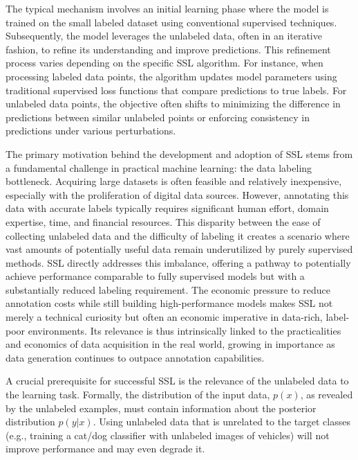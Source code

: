 The typical mechanism involves an initial learning phase where the model is trained on the small labeled dataset using conventional supervised techniques. Subsequently, the model leverages the unlabeled data, often in an iterative fashion, to refine its understanding and improve predictions. This refinement process varies depending on the specific SSL algorithm. For instance, when processing labeled data points, the algorithm updates model parameters using traditional supervised loss functions that compare predictions to true labels. For unlabeled data points, the objective often shifts to minimizing the difference in predictions between similar unlabeled points or enforcing consistency in predictions under various perturbations.

The primary motivation behind the development and adoption of SSL stems from a fundamental challenge in practical machine learning: the data labeling bottleneck. Acquiring large datasets is often feasible and relatively inexpensive, especially with the proliferation of digital data sources. However, annotating this data with accurate labels typically requires significant human effort, domain expertise, time, and financial resources. This disparity between the ease of collecting unlabeled data and the difficulty of labeling it creates a scenario where vast amounts of potentially useful data remain underutilized by purely supervised methods. SSL directly addresses this imbalance, offering a pathway to potentially achieve performance comparable to fully supervised models but with a substantially reduced labeling requirement. The economic pressure to reduce annotation costs while still building high-performance models makes SSL not merely a technical curiosity but often an economic imperative in data-rich, label-poor environments. Its relevance is thus intrinsically linked to the practicalities and economics of data acquisition in the real world, growing in importance as data generation continues to outpace annotation capabilities.

A crucial prerequisite for successful SSL is the relevance of the unlabeled data to the learning task. Formally, the distribution of the input data, $p(x)$, as revealed by the unlabeled examples, must contain information about the posterior distribution $p(y|x)$. Using unlabeled data that is unrelated to the target classes (e.g., training a cat/dog classifier with unlabeled images of vehicles) will not improve performance and may even degrade it.



